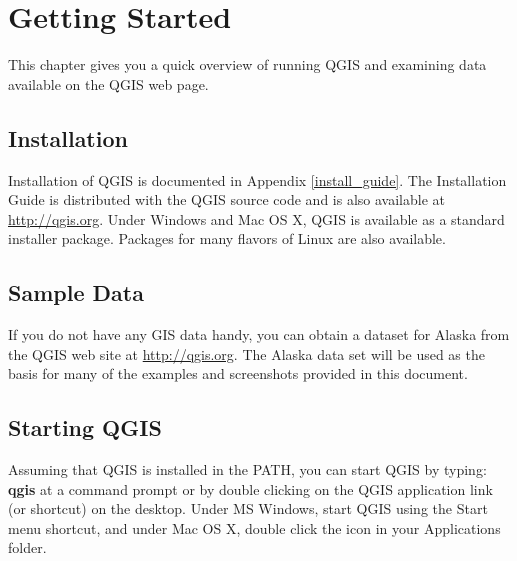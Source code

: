 \chapter{Getting Started}

This chapter gives you a quick overview of running QGIS and examining data
available on the QGIS web page.


\section{Installation}
Installation of QGIS is documented in Appendix \ref{install_guide}. The
Installation Guide is distributed with the QGIS source code and is also
available at \url{http://qgis.org}. Under Windows and Mac OS X, QGIS is
available as a standard installer package. Packages for
many flavors of Linux are also available. 


\section{Sample Data}
 If you do not have any GIS data handy, you can obtain a
dataset for Alaska from the QGIS web site at \url{http://qgis.org}. The Alaska
data set will be used as the basis for many of the examples and screenshots
provided in this document.


\section{Starting QGIS}

Assuming that QGIS is installed in the PATH, you can start QGIS by typing:
\textbf{qgis}  at a command prompt or by double clicking on the QGIS
application link (or shortcut) on the desktop. Under MS Windows, start QGIS
using the Start menu shortcut, and under Mac OS X, double click the icon in
your Applications folder.
